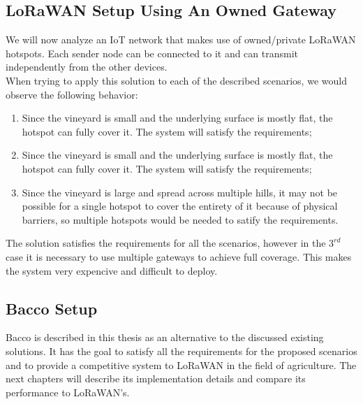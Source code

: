 \subsection{LoRaWAN Setup Using An Owned Gateway}
We will now analyze an \gls{IoT} network that makes use of owned/private LoRaWAN hotspots. Each
sender node can be connected to it and can transmit independently from the other devices.\\
When trying to apply this solution to each of the described scenarios, we would observe the following behavior:
\begin{enumerate}
    \item Since the vineyard is small and the underlying surface is mostly flat, the hotspot can fully cover it. The
        system will satisfy the requirements;
    \item Since the vineyard is small and the underlying surface is mostly flat, the hotspot can fully cover it. The
        system will satisfy the requirements;
    \item Since the vineyard is large and spread across multiple hills, it may not be possible for a single hotspot to
        cover the entirety of it because of physical barriers, so multiple hotspots would be needed to satify the
        requirements.
\end{enumerate}
The solution satisfies the requirements for all the scenarios, however in the $3^{rd}$ case it is necessary to use
multiple gateways to achieve full coverage. This makes the system very expencive and difficult to deploy.

\subsection{Bacco Setup}
Bacco is described in this thesis as an alternative to the discussed existing solutions. It has the goal to satisfy all
the requirements for the proposed scenarios and to provide a competitive system to LoRaWAN in the field of agriculture.
The next chapters will describe its implementation details and compare its performance to LoRaWAN's.
